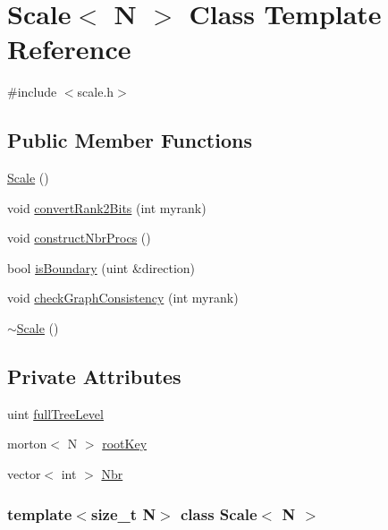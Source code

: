 \hypertarget{classScale}{
\section{Scale$<$ N $>$ Class Template Reference}
\label{classScale}
}


{\ttfamily \#include $<$scale.h$>$}\subsection*{Public Member Functions}
\begin{DoxyCompactItemize}
\item 
\hyperlink{classScale_a3a5aac56c720ec136899e4ea321d8377}{Scale} ()
\item 
void \hyperlink{classScale_aab804122485a038184899d95b7c1bea4}{convertRank2Bits} (int myrank)
\item 
void \hyperlink{classScale_ac022f89a6d1e9dcd4e6380d39e5d6fdd}{constructNbrProcs} ()
\item 
bool \hyperlink{classScale_acfcd50192078b937a19be52c1c6099a1}{isBoundary} (uint \&direction)
\item 
void \hyperlink{classScale_a8df0d89e4b1df03382d9a8c0ddc43ba0}{checkGraphConsistency} (int myrank)
\item 
\hyperlink{classScale_a76e8ff2b4110cef6885e96bb4dfaf159}{$\sim$Scale} ()
\end{DoxyCompactItemize}
\subsection*{Private Attributes}
\begin{DoxyCompactItemize}
\item 
uint \hyperlink{classScale_a346a8932dff67a83f5d4c52f0dd854d7}{fullTreeLevel}
\item 
morton$<$ N $>$ \hyperlink{classScale_a791e37e8f1f874120767ca2ee4d4d980}{rootKey}
\item 
vector$<$ int $>$ \hyperlink{classScale_a1e38e92d1d5dc5827d42b50d1d15de02}{Nbr}
\end{DoxyCompactItemize}
\subsubsection*{template$<$size\_\-t N$>$ class Scale$<$ N $>$}



